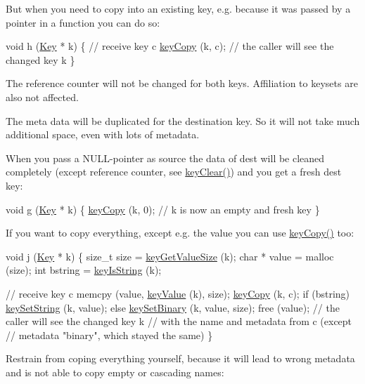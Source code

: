 But when you need to copy into an existing key, e.\+g. because it was passed by a pointer in a function you can do so\+:


\begin{DoxyCodeInclude}
\textcolor{keywordtype}{void} h (\hyperlink{classkdb_1_1Key_a5679f5cae63caddd64a60388b9cc77fa}{Key} * k)
\{
        \textcolor{comment}{// receive key c}
        \hyperlink{group__key_ga6a12cbbe656a1ad9f41b8c681d7a2f92}{keyCopy} (k, c);
        \textcolor{comment}{// the caller will see the changed key k}
\}
\end{DoxyCodeInclude}
 The reference counter will not be changed for both keys. Affiliation to keysets are also not affected.

The meta data will be duplicated for the destination key. So it will not take much additional space, even with lots of metadata.

When you pass a N\+U\+L\+L-\/pointer as source the data of dest will be cleaned completely (except reference counter, see \hyperlink{group__key_gab2242311a36bbc0520e0d36895107ec1}{key\+Clear()}) and you get a fresh dest key\+:


\begin{DoxyCodeInclude}
\textcolor{keywordtype}{void} g (\hyperlink{classkdb_1_1Key_a5679f5cae63caddd64a60388b9cc77fa}{Key} * k)
\{
        \hyperlink{group__key_ga6a12cbbe656a1ad9f41b8c681d7a2f92}{keyCopy} (k, 0);
        \textcolor{comment}{// k is now an empty and fresh key}
\}
\end{DoxyCodeInclude}
 If you want to copy everything, except e.\+g. the value you can use \hyperlink{group__key_ga6a12cbbe656a1ad9f41b8c681d7a2f92}{key\+Copy()} too\+:


\begin{DoxyCodeInclude}
\textcolor{keywordtype}{void} j (\hyperlink{classkdb_1_1Key_a5679f5cae63caddd64a60388b9cc77fa}{Key} * k)
\{
        \textcolor{keywordtype}{size\_t} size = \hyperlink{group__keyvalue_gae326672fffb7474abfe9baf53b73217e}{keyGetValueSize} (k);
        \textcolor{keywordtype}{char} * value = malloc (size);
        \textcolor{keywordtype}{int} bstring = \hyperlink{group__keytest_gaea7670778abd07fee0fe8ac12a149190}{keyIsString} (k);

        \textcolor{comment}{// receive key c}
        memcpy (value, \hyperlink{group__keyvalue_ga6f29609c5da53c6dc26a98678d5752af}{keyValue} (k), size);
        \hyperlink{group__key_ga6a12cbbe656a1ad9f41b8c681d7a2f92}{keyCopy} (k, c);
        \textcolor{keywordflow}{if} (bstring)
                \hyperlink{group__keyvalue_ga622bde1eb0e0c4994728331326340ef2}{keySetString} (k, value);
        \textcolor{keywordflow}{else}
                \hyperlink{group__keyvalue_gaa50a5358fd328d373a45f395fa1b99e7}{keySetBinary} (k, value, size);
        free (value);
        \textcolor{comment}{// the caller will see the changed key k}
        \textcolor{comment}{// with the name and metadata from c (except}
        \textcolor{comment}{// metadata "binary", which stayed the same)}
\}
\end{DoxyCodeInclude}
 Restrain from coping everything yourself, because it will lead to wrong metadata and is not able to copy empty or cascading names\+:


